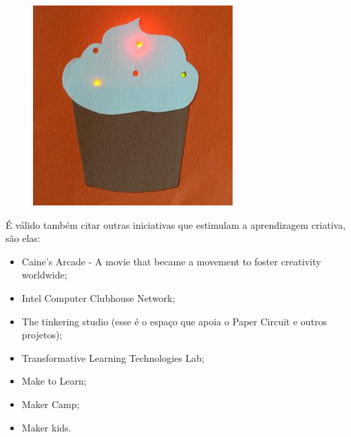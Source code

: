 \begin{figure}[ht]
\centering
\includegraphics[width=.5\textwidth]{edit/img/circuitpaper4.jpg}
\caption{}
\label{fig:exampleFig1}
\end{figure}

É válido também citar outras iniciativas que estimulam a aprendizagem criativa, são elas:
\begin{itemize}
  \item Caine’s Arcade - A movie that became a movement to foster creativity worldwide;
  \item Intel Computer Clubhouse Network;
  \item The tinkering studio (esse é o espaço que apoia o Paper Circuit e outros projetos);
  \item Transformative Learning Technologies Lab;
  \item Make to Learn;
  \item Maker Camp;
  \item Maker kids.
\end{itemize}


